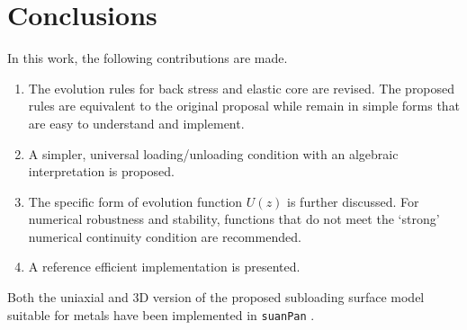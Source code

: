 \section{Conclusions}
In this work, the following contributions are made.
\begin{enumerate}
    \item The evolution rules for back stress and elastic core are revised.
          The proposed rules are equivalent to the original proposal while remain in simple forms that are easy to understand and implement.
    \item A simpler, universal loading/unloading condition with an algebraic interpretation is proposed.
    \item The specific form of evolution function $U\left(z\right)$ is further discussed.
          For numerical robustness and stability, functions that do not meet the `strong' numerical continuity condition are recommended.
    \item A reference efficient implementation is presented.
\end{enumerate}

Both the uniaxial and 3D version of the proposed subloading surface model suitable for metals have been implemented in \texttt{suanPan} \citep{Chang2022}.